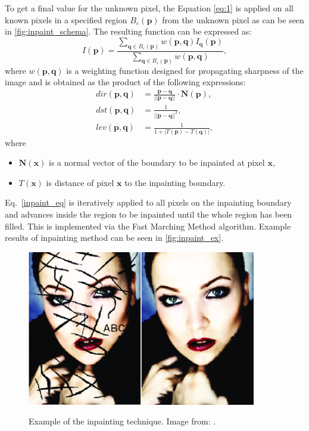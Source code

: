 \documentclass[twoside]{ctuthesis}
\theoremstyle{plain}
\theoremstyle{definition}
\theoremstyle{note}
\begin{document}
To get a final value for the unknown pixel, the Equation \eqref{eq:1} is applied on all known pixels in a specified region $B_{\varepsilon}(\mathbf{p})$ from the unknown pixel as can be seen in  \autoref{fig:inpaint_schema}. The resulting function can be expressed as:
\begin{equation}\label{inpaint_eq}
	I(\mathbf{p})=\frac{\sum_{\mathbf{q}\in B_{\varepsilon}(\mathbf{p})}w(\mathbf{p},\mathbf{q})I_{\mathbf{q}}(\mathbf{p})}{\sum_{\mathbf{q}\in B_{\varepsilon}(\mathbf{p})}w(\mathbf{p},\mathbf{q})},
\end{equation}
where $w(\mathbf{p},\mathbf{q})$ is a weighting function designed for propagating sharpness of the image and is obtained as the product of the following expressions:
\begin{equation}
	\begin{aligned}
		dir(\mathbf{p},\mathbf{q})&=\frac{\mathbf{p}-\mathbf{q}}{||\mathbf{p}-\mathbf{q}||}\cdot\mathbf{N(p)},\\
		dst(\mathbf{p},\mathbf{q})&=\frac{1}{||\mathbf{p}-\mathbf{q}||^2},\\
		lev(\mathbf{p},\mathbf{q})&=\frac{1}{1+|T(\mathbf{p})-T(\mathbf{q})|},
	\end{aligned}
\end{equation}
where
\begin{itemize}
	\item $\mathbf{N(x)}$ is a normal vector of the boundary to be inpainted at pixel $\mathbf{x}$,
	\item $T(\mathbf{x})$ is distance of pixel $\mathbf{x}$ to the inpainting boundary.
\end{itemize}
Eq.~\eqref{inpaint_eq} is iteratively applied to all pixels on the inpainting boundary and advances inside the region to be inpainted until the whole region has been filled. This is implemented via the Fast Marching Method algorithm. Example results of inpainting method can be seen in \autoref{fig:inpaint_ex}.
\begin{figure}
	\caption[Example of the inpainting technique.]{Example of the inpainting technique. Image from: \cite{cite:5}.}
	\includegraphics[width=10cm]{inpaint_example.png}
	\centering
	\label{fig:inpaint_ex}
\end{figure}
\end{document}

